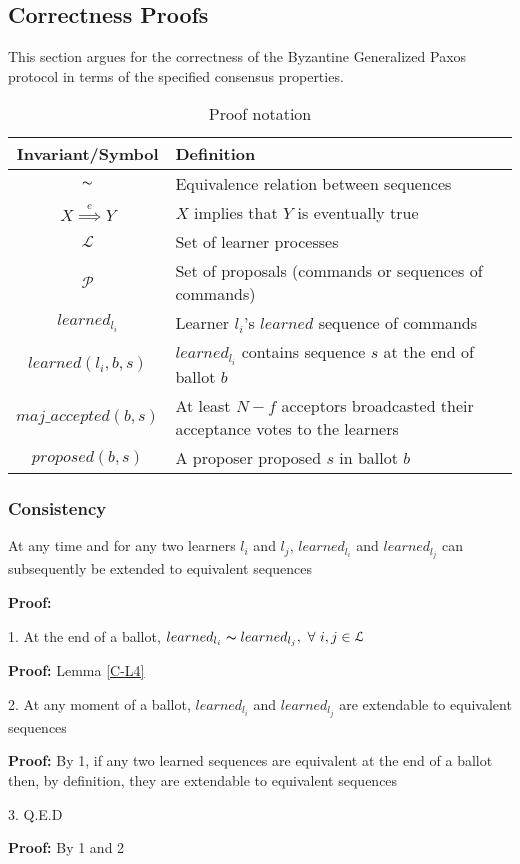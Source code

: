 \subsection{Correctness Proofs}

This section argues for the correctness of the Byzantine Generalized Paxos protocol in terms of the specified consensus properties.\par


\begin{table}[h!]
	\renewcommand{\arraystretch}{1.5}
	\centering
	\begin{tabularx}{\linewidth}{ |c|X|}
		\hline
		Invariant/Symbol & Definition \\
		\hline
		$\thicksim$ & Equivalence relation between sequences \\
		\hline
		$X \overset{e}{\implies} Y$ & $X$ implies that $Y$ is eventually true \\
		\hline
		$\mathcal{L}$ & Set of learner processes \\
		\hline
		$\mathcal{P}$ & Set of proposals (commands or sequences of commands) \\
		\hline
		$learned_{l_i}$ & Learner $l_i$'s $learned$ sequence of commands \\
		\hline
		$learned(l_i,b,s)$ & $learned_{l_i}$ contains sequence $s$ at the end of ballot $b$  \\
		\hline
		$maj\_accepted(b,s)$ & At least $N-f$ acceptors broadcasted their acceptance votes to the learners\\
		\hline
		$proposed(b,s)$ & A proposer proposed $s$ in ballot $b$ \\
		\hline
		
	\end{tabularx} 
	\caption{Proof notation} 
	\label{table:1}
\end{table}

\subsubsection{Consistency}
\begin{theorem}
At any time and for any two learners $l_i$ and $l_j$, $learned_{l_i}$ and $learned_{l_j}$ can subsequently be extended to equivalent sequences \label{C-T1}
\end{theorem} 
\textbf{Proof:} \par
1. At the end of a ballot, $learned_{l_i} \thicksim learned_{l_j},\ \forall\ i,j \in \mathcal{L}$\par
\indent\indent\textbf{Proof:} Lemma \ref{C-L4} \par
2. At any moment of a ballot, $learned_{l_i}$ and $learned_{l_j}$ are extendable to equivalent sequences \par
\indent\indent\textbf{Proof:} By 1, if any two learned sequences are equivalent at the end of a ballot then, by definition, they are extendable to equivalent sequences\par
3. Q.E.D \par
\indent\indent\textbf{Proof:} By 1 and 2\par

